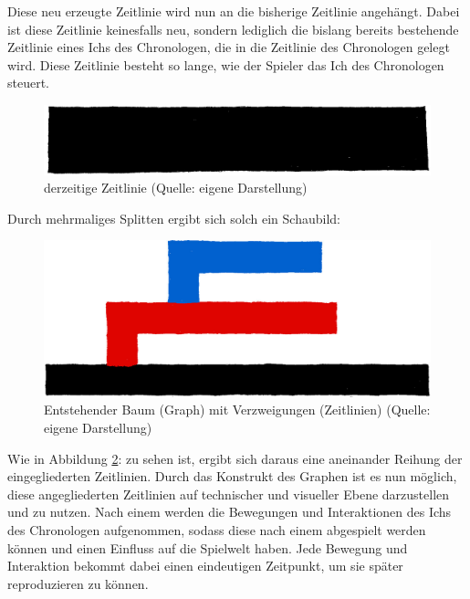 Diese neu erzeugte Zeitlinie wird nun an die bisherige Zeitlinie angehängt. Dabei ist diese Zeitlinie keinesfalls neu, sondern lediglich die bislang bereits bestehende Zeitlinie eines Ichs des Chronologen, die in die Zeitlinie des Chronologen gelegt wird. Diese Zeitlinie besteht so lange, wie der Spieler das Ich des Chronologen steuert.
\begin{figure}[ht]
\centering
\includegraphics[width=0.5\linewidth]{content/pictures/Timeline.jpg}
\caption{derzeitige Zeitlinie (Quelle: eigene Darstellung)}
\label{fig:timeline}
\end{figure}
Durch mehrmaliges Splitten ergibt sich solch ein Schaubild:
\begin{figure}[ht]
\centering
\includegraphics[width=1\linewidth]{content/pictures/Merge.jpg}
\caption{Entstehender Baum (Graph) mit Verzweigungen (Zeitlinien) (Quelle: eigene Darstellung)}
\label{fig:graph}
\end{figure}
Wie in Abbildung \ref{fig:graph}:  zu sehen ist, ergibt sich daraus eine aneinander Reihung der eingegliederten Zeitlinien. Durch das Konstrukt des Graphen ist es nun möglich, diese angegliederten Zeitlinien auf technischer und visueller Ebene darzustellen und zu nutzen.
Nach einem  werden die Bewegungen und Interaktionen des Ichs des Chronologen aufgenommen, sodass diese nach einem  abgespielt werden können und einen Einfluss auf die Spielwelt haben. Jede Bewegung und Interaktion bekommt dabei einen eindeutigen Zeitpunkt, um sie später reproduzieren zu können.

